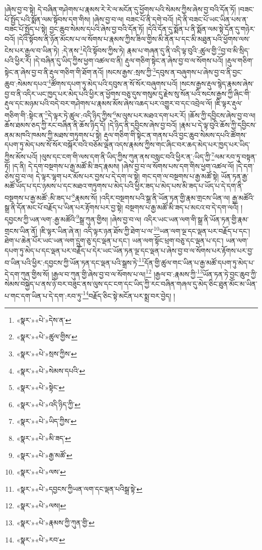།ཞེས་བྱ་བ་སྟེ། དེ་བཞིན་གཤེགས་པ་རྣམས་རེ་རེ་ལ་མངོན་དུ་ཕྱོགས་པའི་སེམས་ཀྱིས་ཞེས་བྱ་བའི་དོན་ཏོ། །བཟང་པོ་སྤྱོད་པའི་སྨོན་ལམ་སྟོབས་དག་གིས། །ཞེས་བྱ་བ་ལ། བཟང་པོ་ནི་དགེ་བའོ། །དེ་ནི་བཟང་པོ་ཡང་ཡིན་པས་ན་བཟང་པོ་སྤྱོད་པ་སྟེ། བྱང་ཆུབ་སེམས་དཔའི་ཞེས་བྱ་བའི་དོན་ཏོ། །དེའི་དོན་དུ་སྨོན་པ་ནི་སྨོན་ལམ་སྟེ་དོན་དུ་གཉེར་བའོ། །དེའི་སྟོབས་ནི་ཉོན་མོངས་པ་ལ་སོགས་པ་རྣམས་ཀྱིས་ཟིལ་གྱིས་མི་ནོན་པ་དང་མི་མཐུན་པའི་ཕྱོགས་ལས་ངེས་པར་རྒྱལ་བ་ཡིན་ཏེ། :དེ་ནས་\footnote{«སྣར་»«པེ་»དེས་ན་}དེའི་སྟོབས་ཀྱིས་ཏེ། རྣམ་པ་གཞན་དུ་ནི་འདི་ལྟ་བུའི་:ཚུལ་གྱི་\footnote{«སྣར་»«པེ་»ཚུལ་གྱིས་}བྱ་བ་མི་སྲིད་པའི་ཕྱིར་རོ། །དེ་བཞིན་དུ་ཡིད་ཀྱིས་ཕྱག་འཚལ་བ་ནི། རྡུལ་གཅིག་སྟེང་ན་ཞེས་བྱ་བ་ལ་སོགས་པའོ། །རྡུལ་གཅིག་སྟེང་ན་ཞེས་བྱ་བ་ནི་རྡུལ་གཅིག་གི་ཐོག་ནའོ། །སངས་རྒྱས་:སྲས་ཀྱི་\footnote{«སྣར་»«པེ་»སྲས་ཀྱིས་}དབུས་ན་བཞུགས་པ་ཞེས་བྱ་བ་ནི་བྱང་ཆུབ་:སེམས་དཔའ་\footnote{«སྣར་»«པེ་»སེམས་དཔའི་}ཚོགས་དཔག་ཏུ་མེད་པའི་དབུས་ན་སོ་སོར་བཞུགས་པའོ། །སངས་རྒྱས་རྡུལ་སྙེད་རྣམས་ཞེས་བྱ་བ་ནི་འདིར་ཡང་ཁྱད་པར་མེད་པའི་ཕྱིར་ན་ཕྱོགས་བཅུ་དུས་གསུམ་དུ་རྗེས་སུ་སོན་པའི་སངས་རྒྱས་ཀྱི་ཞིང་གི་རྡུལ་དང་མཉམ་པའི་བདེ་བར་གཤེགས་པ་རྣམས་མོས་ཞེས་འཆད་པར་འགྱུར་བ་དང་འབྲེལ་ལོ། །ཇི་ལྟར་རྡུལ་གཅིག་གི་:སྟེང་ན་\footnote{«སྣར་»«པེ་»སྟེང་}དེ་ལྟར་ཏེ་ཚུལ་:འདི་ཉིད་ཀྱིས་\footnote{«སྣར་»«པེ་»འདི་ཉིད་ཀྱི་}མ་ལུས་པར་མཐའ་དག་པར་རོ། །ཆོས་ཀྱི་དབྱིངས་ཞེས་བྱ་བ་ལ། ཆོས་ཐམས་ཅད་ཀྱི་རང་བཞིན་ནི་ཆོས་ཉིད་དོ། །དེ་ཉིད་ནི་དབྱིངས་ཞེས་བྱ་བའོ། །རྣམ་པ་དེ་ལྟ་བུའི་ཆོས་ཀྱི་དབྱིངས་ནམ་མཁའི་ཁམས་ཀྱི་མཐས་གཏུགས་པ་སྟེ། རྡུལ་གཅིག་གི་སྟེང་ན་གནས་པའི་བྱང་ཆུབ་སེམས་དཔའི་ཚོགས་དཔག་ཏུ་མེད་པས་སོ་སོར་བསྐོར་བའི་བཅོམ་ལྡན་འདས་རྣམས་ཀྱིས་གང་ཞིང་བར་ཆད་མེད་པར་ཁྱད་པར་ཡིད་ཀྱིས་མོས་པའོ། །ལུས་དང་ངག་གི་ལས་དག་ནི་ཡིད་ཀྱིས་ཀུན་ནས་བསླང་བའི་ཕྱིར་ན་:ཡིད་ཀྱི་\footnote{«སྣར་»«པེ་»ཡིད་ཀྱིས་}ལམ་རབ་ཏུ་བསྟན་ཏོ། །ད་ནི། དེ་དག་བསྔགས་པ་རྒྱ་མཚོ་མི་ཟད་རྣམས། །ཞེས་བྱ་བ་ལ་སོགས་པས་དག་གིས་ཕྱག་འཚལ་ལོ། །དེ་དག་ཅེས་བྱ་བ་ལ། དེ་ལྟར་ལྷག་པར་མོས་པར་བྱས་པ་དེ་དག་ལ་སྟེ། གང་དག་ལ་བསྔགས་པ་རྒྱ་མཚོ་སྟེ། ཡོན་ཏན་རྒྱ་མཚོ་ཡོད་པ་དང་ཉམས་པ་དང་མཐའ་གཏུགས་པ་མེད་པའི་ཕྱིར་ཟད་པ་མེད་པས་མི་ཟད་པ་ཡོད་པ་དེ་དག་ནི་བསྔགས་པ་རྒྱ་མཚོ་:མི་ཟད་པ་\footnote{«སྣར་»«པེ་»མི་ཟད་}རྣམས་སོ། །འདིར་བསྔགས་པའི་སྒྲ་ནི་ཡོན་ཏན་གྱི་རྣམ་གྲངས་ཡིན་ལ། རྒྱ་མཚོའི་སྒྲ་ནི་དོན་མང་པོ་བརྗོད་པ་ཡིན་པར་རྟོགས་པར་བྱ་སྟེ། བསྔགས་པ་རྒྱ་མཚོ་མི་ཟད་པ་མངའ་བ་དེ་དག་ལའོ། །དབྱངས་ཀྱི་ཡན་ལག་:རྒྱ་མཚོའི་\footnote{«སྣར་»«པེ་»རྒྱ་མཚོ་}སྒྲ་ཀུན་གྱིས། །ཞེས་བྱ་བ་ལ། འདིར་ཡང་ཡན་ལག་གི་སྒྲ་ནི་ཡོན་ཏན་གྱི་རྣམ་གྲངས་ཡིན་ནོ། །ཇི་ལྟར་ཡིན་ཞེ་ན། འདི་ལྟར་ཉན་ཐོས་ཀྱི་ཐེག་པ་ལ་\footnote{«སྣར་»«པེ་»ལས་}ཡན་ལག་ལྔ་དང་ལྡན་པར་བརྗོད་པ་དང་། ཐེག་པ་ཆེན་པོར་ཡང་ཡན་ལག་དྲུག་ཅུ་དང་ལྡན་པ་དང་། ཡན་ལག་སྟོང་ཕྲག་བཅུ་དང་ལྡན་པ་དང་། ཡན་ལག་དཔག་ཏུ་མེད་པ་དང་ལྡན་པར་བརྗོད་པ་དེར་ཡང་ཡོན་ཏན་ལྔ་དང་ལྡན་པ་ཞེས་བྱ་བ་ལ་སོགས་པར་རྟོགས་པར་བྱ་བ་ཡིན་པའི་ཕྱིར་:དབྱངས་ཀྱི་ཡོན་ཏན་དང་ལྡན་པའི་སྒྲས་ཏེ་\footnote{«སྣར་»«པེ་»དབྱངས་ཀྱིཡན་ལག་དང་ལྡན་པའིསྒྲ་སྟེ་}དོན་གྱི་ཚུལ་གང་ཡིན་པ་རྒྱ་མཚོ་དཔག་ཏུ་མེད་པ་དེ་དག་ཀུན་གྱིས་སོ། །རྒྱལ་བ་ཀུན་གྱི་ཞེས་བྱ་བ་ལ་སོགས་པ་ལ།\footnote{«སྣར་»«པེ་»ལས།} །རྒྱལ་བ་:རྣམས་ཀྱི་\footnote{«སྣར་»«པེ་»རྣམས་ཀྱི་ཀུན་གྱི་}ཡོན་ཏན་ཏེ་བྱང་ཆུབ་ཀྱི་སེམས་བསྐྱེད་པ་ནས་ཉེ་བར་བཟུང་ནས་ལུས་དང་ངག་དང་ཡིད་ཀྱི་རང་བཞིན་གཞལ་དུ་མེད་ཅིང་ཐུན་མོང་མ་ཡིན་པ་གང་དག་ཡིན་པ་དེ་དག་:རབ་ཏུ་\footnote{«སྣར་»«པེ་»རབ་}བརྗོད་ཅིང་སྟེ་མངོན་པར་སྨྲ་བར་བྱེད། །
